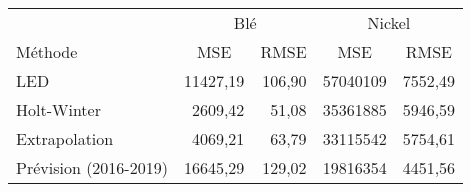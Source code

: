\begin{tabular}{lrrrr}
\toprule
& \multicolumn{2}{c}{Blé} & \multicolumn{2}{c}{Nickel} \\
Méthode & \multicolumn{1}{c}{MSE} & \multicolumn{1}{c}{RMSE} & \multicolumn{1}{c}{MSE} & \multicolumn{1}{c}{RMSE} \\
\cmidrule(r){1-1}\cmidrule(lr){2-3}\cmidrule(lr){4-5}
LED   & 11427,19 & 106,90 & 57040109 & 7552,49 \\
Holt-Winter & 2609,42 & 51,08 & 35361885 & 5946,59 \\
Extrapolation & 4069,21 & 63,79 & 33115542 & 5754,61 \\
\cmidrule(r){1-1}\cmidrule(lr){2-3}\cmidrule(lr){4-5}
Prévision (2016-2019)  &16645,29 & 129,02 &	19816354 &	4451,56 \\
\bottomrule
\end{tabular}%

